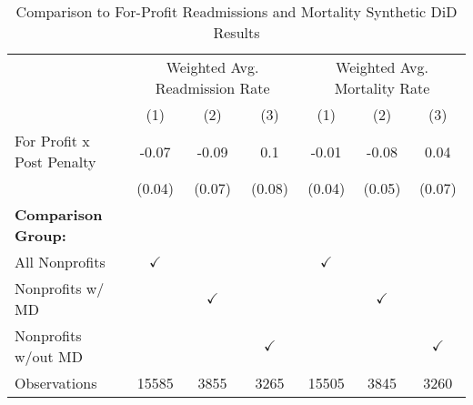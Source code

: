 \begin{table}[ht!]

\caption{\label{tab:forprofit_synth} Comparison to For-Profit Readmissions and Mortality Synthetic DiD Results}
\centering
\begin{tabular}[t]{lcccccc}
\toprule
\multicolumn{1}{c}{ } & \multicolumn{3}{c}{Weighted Avg. Readmission Rate} & \multicolumn{3}{c}{Weighted Avg. Mortality Rate} \\
\cmidrule(l{3pt}r{3pt}){2-4} \cmidrule(l{3pt}r{3pt}){5-7}
 & (1) & (2) & (3) & (1) & (2) & (3)\\
\midrule
For Profit x Post Penalty & -0.07 & -0.09 & 0.1 & -0.01 & -0.08 & 0.04\\
 & (0.04) & (0.07) & (0.08) & (0.04) & (0.05) & (0.07)\\
\textbf{Comparison Group:} &  &  &  &  &  & \\
All Nonprofits & $\checkmark$ &  &  & $\checkmark$ &  & \\
Nonprofits w/ MD &  & $\checkmark$ &  &  & $\checkmark$ & \\
\addlinespace
Nonprofits w/out MD &  &  & $\checkmark$ &  &  & $\checkmark$\\
Observations & 15585 & 3855 & 3265 & 15505 & 3845 & 3260\\
\bottomrule
\end{tabular}
\end{table}
